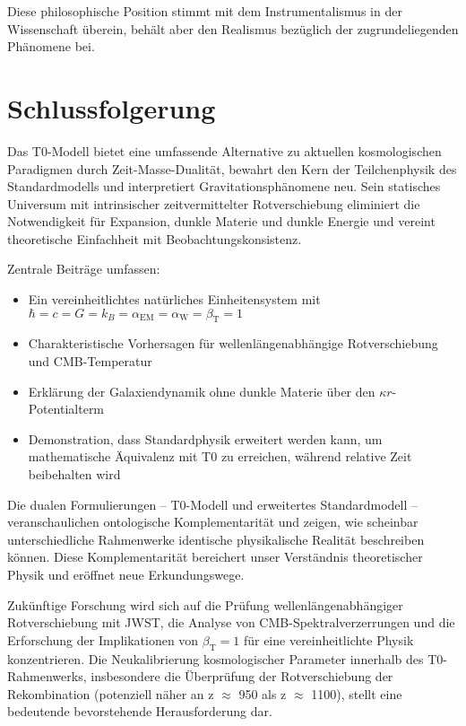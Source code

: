 \documentclass[twocolumn,aps,prl]{revtex4-2}
\newcommand{\alphaEM}{\alpha_{\text{EM}}}
\newcommand{\alphaW}{\alpha_{\text{W}}}
\newcommand{\betaT}{\beta_{\text{T}}}
\begin{document}
	Diese philosophische Position stimmt mit dem Instrumentalismus in der Wissenschaft überein, behält aber den Realismus bezüglich der zugrundeliegenden Phänomene bei.
	
	\section{Schlussfolgerung}
	\label{sec:conclusion}
	
	Das T0-Modell bietet eine umfassende Alternative zu aktuellen kosmologischen Paradigmen durch Zeit-Masse-Dualität, bewahrt den Kern der Teilchenphysik des Standardmodells und interpretiert Gravitationsphänomene neu. Sein statisches Universum mit intrinsischer zeitvermittelter Rotverschiebung eliminiert die Notwendigkeit für Expansion, dunkle Materie und dunkle Energie und vereint theoretische Einfachheit mit Beobachtungskonsistenz.
	
	Zentrale Beiträge umfassen:
	\begin{itemize}
		\item Ein vereinheitlichtes natürliches Einheitensystem mit \(\hbar = c = G = k_B = \alphaEM = \alphaW = \betaT = 1\)
		\item Charakteristische Vorhersagen für wellenlängenabhängige Rotverschiebung und CMB-Temperatur
		\item Erklärung der Galaxiendynamik ohne dunkle Materie über den \(\kappa r\)-Potentialterm
		\item Demonstration, dass Standardphysik erweitert werden kann, um mathematische Äquivalenz mit T0 zu erreichen, während relative Zeit beibehalten wird
	\end{itemize}
	
	Die dualen Formulierungen – T0-Modell und erweitertes Standardmodell – veranschaulichen ontologische Komplementarität und zeigen, wie scheinbar unterschiedliche Rahmenwerke identische physikalische Realität beschreiben können. Diese Komplementarität bereichert unser Verständnis theoretischer Physik und eröffnet neue Erkundungswege.
	
	Zukünftige Forschung wird sich auf die Prüfung wellenlängenabhängiger Rotverschiebung mit JWST, die Analyse von CMB-Spektralverzerrungen und die Erforschung der Implikationen von \(\betaT = 1\) für eine vereinheitlichte Physik konzentrieren. Die Neukalibrierung kosmologischer Parameter innerhalb des T0-Rahmenwerks, insbesondere die Überprüfung der Rotverschiebung der Rekombination (potenziell näher an z $\approx$ 950 als z $\approx$ 1100), stellt eine bedeutende bevorstehende Herausforderung dar.
	
\end{document}
